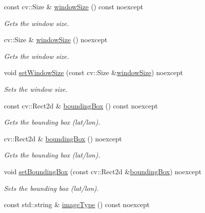 \begin{DoxyCompactItemize}
const cv\+::\+Size \& \hyperlink{group___classification_module_ga630682de2af39cabdad720964e5047e9}{window\+Size} () const noexcept
\begin{DoxyCompactList}\small\item\em Gets the window size. \end{DoxyCompactList}\item 
cv\+::\+Size \& \hyperlink{group___classification_module_ga44f6f6da4f8738af4aa302524e7929ce}{window\+Size} () noexcept
\begin{DoxyCompactList}\small\item\em Gets the window size. \end{DoxyCompactList}\item 
void \hyperlink{group___classification_module_gac52cca4a6595cde91a1db6a76ab53eb0}{set\+Window\+Size} (const cv\+::\+Size \&\hyperlink{group___classification_module_ga630682de2af39cabdad720964e5047e9}{window\+Size}) noexcept
\begin{DoxyCompactList}\small\item\em Sets the window size. \end{DoxyCompactList}\item 
const cv\+::\+Rect2d \& \hyperlink{group___classification_module_ga69944ef95e7eeb403596b0f25eb677ec}{bounding\+Box} () const noexcept
\begin{DoxyCompactList}\small\item\em Gets the bounding box (lat/lon). \end{DoxyCompactList}\item 
cv\+::\+Rect2d \& \hyperlink{group___classification_module_gae4241cbe434313f9cc26d1d030ec9655}{bounding\+Box} () noexcept
\begin{DoxyCompactList}\small\item\em Gets the bounding box (lat/lon). \end{DoxyCompactList}\item 
void \hyperlink{group___classification_module_gab38e9f9c894441321a28a2074f91e5da}{set\+Bounding\+Box} (const cv\+::\+Rect2d \&\hyperlink{group___classification_module_ga69944ef95e7eeb403596b0f25eb677ec}{bounding\+Box}) noexcept
\begin{DoxyCompactList}\small\item\em Sets the bounding box (lat/lon). \end{DoxyCompactList}\item 
const std\+::string \& \hyperlink{group___classification_module_ga572f92d09d217ff3a0661fe9f6df4247}{image\+Type} () const noexcept

\end{DoxyCompactItemize}
